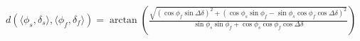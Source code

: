 \documentclass{beamer}
\begin{document}
\begin{preview}
$
  \displaystyle{d(\langle \phi_s, \delta_s \rangle, \langle \phi_f, \delta_f \rangle)
   =  \arctan \left( \frac{\sqrt{\left( \cos \phi_f \sin \Delta
  \delta \right)^2 + \left( \cos \phi_s \sin \phi_f - \sin \phi_s \cos \phi_f
  \cos \Delta \delta \right)^2}}{\sin \phi_s \sin \phi_f + \cos \phi_s \cos
  \phi_f \cos \Delta \delta} \right)}
$
\end{preview}
\end{document}
